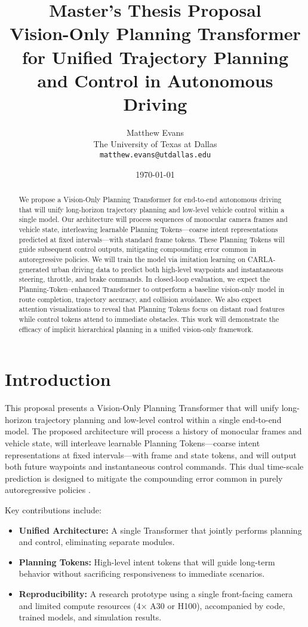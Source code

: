 \documentclass[11pt,a4paper]{article}
\title{Master's Thesis Proposal\\\Large{Vision-Only Planning Transformer for Unified Trajectory Planning and Control in Autonomous Driving}}
\author{Matthew Evans \\ The University of Texas at Dallas \\ \texttt{matthew.evans@utdallas.edu}}
\date{\today}
\begin{document}
\maketitle

\begin{abstract}
    We propose a Vision-Only Planning Transformer for end-to-end autonomous driving that will unify long-horizon trajectory planning and low-level vehicle control within a single model. Our architecture will process sequences of monocular camera frames and vehicle state, interleaving learnable Planning Tokens—coarse intent representations predicted at fixed intervals—with standard frame tokens. These Planning Tokens will guide subsequent control outputs, mitigating compounding error common in autoregressive policies. We will train the model via imitation learning on CARLA-generated urban driving data to predict both high-level waypoints and instantaneous steering, throttle, and brake commands. In closed-loop evaluation, we expect the Planning-Token–enhanced Transformer to outperform a baseline vision-only model in route completion, trajectory accuracy, and collision avoidance. We also expect attention visualizations to reveal that Planning Tokens focus on distant road features while control tokens attend to immediate obstacles. This work will demonstrate the efficacy of implicit hierarchical planning in a unified vision-only framework.
\end{abstract}


\section*{Introduction}
This proposal presents a Vision-Only Planning Transformer that will unify long-horizon trajectory planning and low-level control within a single end-to-end model. The proposed architecture will process a history of monocular frames and vehicle state, will interleave learnable Planning Tokens—coarse intent representations at fixed intervals—with frame and state tokens, and will output both future waypoints and instantaneous control commands. This dual time-scale prediction is designed to mitigate the compounding error common in purely autoregressive policies \cite{clinton2024planningtransformerlonghorizonoffline}.

Key contributions include:
\begin{itemize}
    \item \textbf{Unified Architecture:} A single Transformer that jointly performs planning and control, eliminating separate modules.
    \item \textbf{Planning Tokens:} High-level intent tokens that will guide long-term behavior without sacrificing responsiveness to immediate scenarios.
    \item \textbf{Reproducibility:} A research prototype using a single front-facing camera and limited compute resources (4× A30 or H100), accompanied by code, trained models, and simulation results.
\end{itemize}
\end{document}
